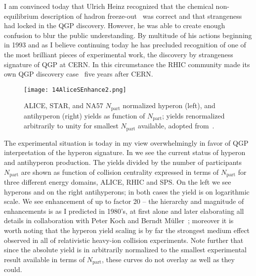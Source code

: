 \documentclass{appolb}
\begin{document}
I am convinced today that Ulrich Heinz recognized that the chemical non-equilibrium description of hadron freeze-out~\cite{Rafelski:1999xv} was correct and that strangeness had locked in the QGP discovery. However, he was able to create enough confusion to blur the public understanding. By multitude of his actions beginning in 1993 and as I believe continuing today he has precluded recognition of one of the most brilliant pieces of experimental work, the discovery by strangeness signature of QGP at CERN. In this circumstance the RHIC community made its own QGP discovery case~\cite{RHIC2005a,RHIC2005b,RHIC2005c,RHIC2005d} five years after CERN. 

 
\begin{figure}[bht]
\centerline{%
\texttt{[image: 14AliceSEnhance2.png]}}
\caption{ALICE, STAR, and NA57 $N_\mathrm{part}$ normalized hyperon (left), and antihyperon (right) yields as function of $N_\mathrm{part}$; yields renormalized arbitrarily to unity for smallest $N_\mathrm{part}$ available, adopted from~\cite{ABELEV:2013zaa}.}
\label{AliceALL}
\end{figure}

The experimental situation is today in my view overwhelmingly in favor of QGP interpretation of the hyperon signature. In  we see the current status of hyperon and antihyperon production. The yields divided by the number of participants $N_\mathrm{part}$ are shown as function of collision centrality expressed in terms of $N_\mathrm{part}$ for three different energy domains, ALICE, RHIC and SPS. On the left we see hyperons and on the right antihyperons; in both cases the yield is on logarithmic scale. We see enhancement of up to factor 20 -- the hierarchy and magnitude of enhancements is as I predicted in 1980\rq s, at first alone and later elaborating all details in collaboration with Peter Koch and Berndt M\"uller~\cite{Koch:1986ud}; moreover it is worth noting that the hyperon yield scaling is by far the strongest medium effect observed in all of relativistic heavy-ion collision experiments. Note further that since the absolute yield is in  arbitrarily normalized to the smallest experimental result available in terms of $N_\mathrm{part}$, these curves do not overlay as well as they could.
\end{document}
